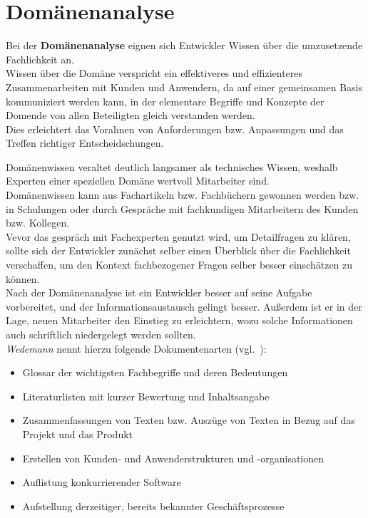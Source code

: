 \section{Domänenanalyse}

\noindent
Bei der \textbf{Domänenanalyse} eignen sich Entwickler Wissen über die umzusetzende Fachlichkeit an.\\

\noindent
Wissen über die Domäne verspricht ein effektiveres und effizienteres Zusammenarbeiten mit Kunden und Anwendern, da auf einer gemeinsamen Basis kommuniziert werden kann, in der elementare Begriffe und Konzepte der Domende von allen Beteiligten gleich verstanden werden.\\
Dies erleichtert das Vorahnen von Anforderungen bzw. Anpassungen und das Treffen richtiger Entscheidschungen.

\noindent
Domänenwissen veraltet deutlich langsamer als technisches Wissen, weshalb Experten einer speziellen Domäne wertvoll Mitarbeiter sind.\\

\noindent
Domänenwissen kann aus Fachartikeln bzw. Fachbüchern gewonnen werden bzw. in Schulungen oder durch Gespräche mit fachkundigen Mitarbeitern des Kunden bzw. Kollegen.\\
Vevor das gespräch mit Fachexperten genutzt wird, um Detailfragen zu klären, sollte sich der Entwickler zunächst selber einen Überblick über die Fachlichkeit verschaffen, um den Kontext fachbezogener Fragen selber besser einschätzen zu können.\\

\noindent
Nach der Domänenanalyse ist ein Entwickler besser auf seine Aufgabe vorbereitet, und der Informationsaustausch gelingt besser.
Außerdem ist er in der Lage, neuen Mitarbeiter den Einstieg zu erleichtern, wozu solche Informationen auch schriftlich niedergelegt werden sollten.\\
\textit{Wedemann} nennt hierzu folgende Dokumentenarten (vgl.~\cite[42]{Wed09}):

\begin{itemize}
    \item Glossar der wichtigsten Fachbegriffe und deren Bedeutungen
    \item Literaturlisten mit kurzer Bewertung und Inhaltsangabe
    \item Zusammenfassungen von Texten bzw. Auszüge von Texten in Bezug auf das Projekt und das Produkt
    \item Erstellen von Kunden- und Anwenderstrukturen und -organisationen
    \item Auflistung konkurrierender Software
    \item Aufstellung derzeitiger, bereits bekannter Geschäftsprozesse
\end{itemize}